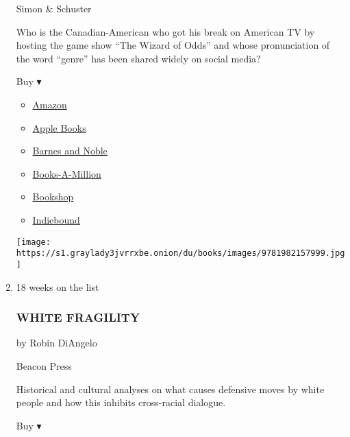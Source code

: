 \begin{enumerate}
  Simon \& Schuster

  Who is the Canadian-American who got his break on American TV by
  hosting the game show ``The Wizard of Odds'' and whose pronunciation
  of the word ``genre'' has been shared widely on social media?

  Buy ▾

  \begin{itemize}
  \tightlist
  \item
    \href{https://www.amazon.com/dp/1982157992?tag=NYTBSREV-20\&tag=NYTBS-20}{Amazon}
  \item
    \href{https://du-gae-books-dot-nyt-du-prd.appspot.com/buy?title=THE+ANSWER+IS+...\&author=Alex+Trebek}{Apple
    Books}
  \item
    \href{https://www.anrdoezrs.net/click-7990613-11819508?url=https\%3A\%2F\%2Fwww.barnesandnoble.com\%2Fw\%2F\%3Fean\%3D9781982157999}{Barnes
    and Noble}
  \item
    \href{https://www.anrdoezrs.net/click-7990613-35140?url=https\%3A\%2F\%2Fwww.booksamillion.com\%2Fp\%2FTHE\%2BANSWER\%2BIS\%2B...\%2FAlex\%2BTrebek\%2F9781982157999}{Books-A-Million}
  \item
    \href{https://bookshop.org/a/3546/9781982157999}{Bookshop}
  \item
    \href{https://www.indiebound.org/book/9781982157999?aff=NYT}{Indiebound}
  \end{itemize}

  \texttt{[image: https://s1.graylady3jvrrxbe.onion/du/books/images/9781982157999.jpg]}
\item
  18 weeks on the list

  \hypertarget{white-fragility}{%
  \subsubsection{WHITE FRAGILITY}\label{white-fragility}}

  by Robin DiAngelo

  Beacon Press

  Historical and cultural analyses on what causes defensive moves by
  white people and how this inhibits cross-racial dialogue.

  Buy ▾


\end{enumerate}
